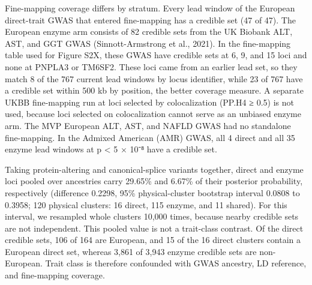 Fine-mapping coverage differs by stratum. Every lead window of the European direct-trait GWAS that entered fine-mapping has a credible set (47 of 47). The European enzyme arm consists of 82 credible sets from the UK Biobank ALT, AST, and GGT GWAS (Sinnott-Armstrong et al., 2021). In the fine-mapping table used for Figure S2X, these GWAS have credible sets at 6, 9, and 15 loci and none at PNPLA3 or TM6SF2. These loci came from an earlier lead set, so they match 8 of the 767 current lead windows by locus identifier, while 23 of 767 have a credible set within 500 kb by position, the better coverage measure. A separate UKBB fine-mapping run at loci selected by colocalization (PP.H4 ≥ 0.5) is not used, because loci selected on colocalization cannot serve as an unbiased enzyme arm. The MVP European ALT, AST, and NAFLD GWAS had no standalone fine-mapping. In the Admixed American (AMR) GWAS, all 4 direct and all 35 enzyme lead windows at p \textless{} 5 × 10⁻⁸ have a credible set.

Taking protein-altering and canonical-splice variants together, direct and enzyme loci pooled over ancestries carry 29.65\% and 6.67\% of their posterior probability, respectively (difference 0.2298, 95\% physical-cluster bootstrap interval 0.0808 to 0.3958; 120 physical clusters: 16 direct, 115 enzyme, and 11 shared). For this interval, we resampled whole clusters 10,000 times, because nearby credible sets are not independent. This pooled value is not a trait-class contrast. Of the direct credible sets, 106 of 164 are European, and 15 of the 16 direct clusters contain a European direct set, whereas 3,861 of 3,943 enzyme credible sets are non-European. Trait class is therefore confounded with GWAS ancestry, LD reference, and fine-mapping coverage.

